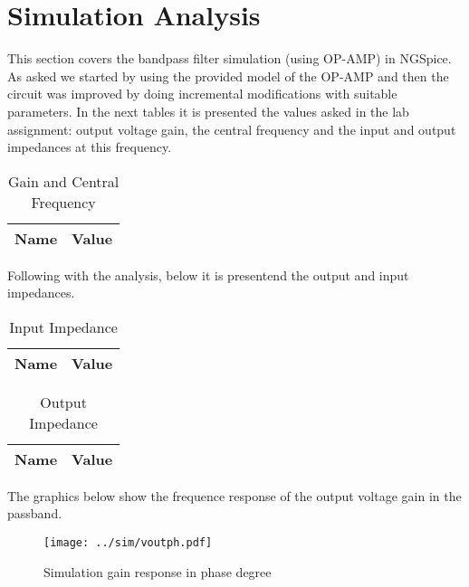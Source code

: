 \section{Simulation Analysis}
\label{sec:simulation}

\hspace{0,5cm} This section covers the bandpass filter simulation (using OP-AMP) in NGSpice. As asked we started by using the provided model of the OP-AMP and then the circuit was improved by doing incremental modifications with suitable parameters. In the next tables it is presented the values asked in the lab assignment: output voltage gain, the central frequency and the input and output impedances at this frequency.

\begin{table}[!ht]
  \centering
  \begin{tabular}{|l|r|}
    \hline    
    {\bf Name} & {\bf Value } \\ \hline
    
  \end{tabular}
  \caption{Gain and Central Frequency}
  \label{tab:ng3}
\end{table}

\par Following with the analysis, below it is presentend the output and input impedances.

\begin{table}[!ht]
  \centering
  \begin{tabular}{|l|r|}
    \hline    
    {\bf Name} & {\bf Value } \\ \hline
    
  \end{tabular}
  \caption{Input Impedance}
  \label{tab:ng4}
\end{table}

\begin{table}[!ht]
  \centering
  \begin{tabular}{|l|r|}
    \hline    
    {\bf Name} & {\bf Value } \\ \hline
    
  \end{tabular}
  \caption{Output Impedance}
  \label{tab:ng4}
\end{table}

\par The graphics below show the frequence response of the output voltage gain in the passband.

\begin{figure}[H] \centering
\texttt{[image: ../sim/voutph.pdf]}
\caption{Simulation gain response in phase degree}
\label{fig:ng1}
\end{figure}

